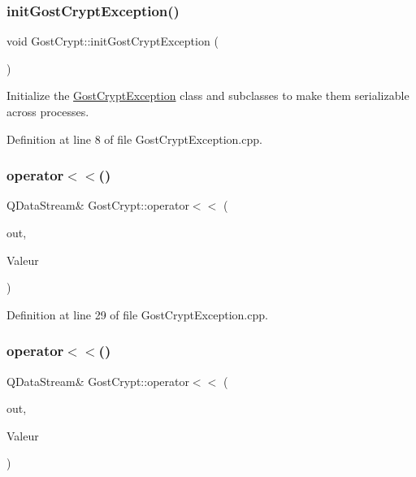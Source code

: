 \subsubsection{\texorpdfstring{init\+Gost\+Crypt\+Exception()}{initGostCryptException()}}
{\footnotesize\ttfamily void Gost\+Crypt\+::init\+Gost\+Crypt\+Exception (\begin{DoxyParamCaption}{ }\end{DoxyParamCaption})}



Initialize the \hyperlink{class_gost_crypt_1_1_gost_crypt_exception}{Gost\+Crypt\+Exception} class and subclasses to make them serializable across processes. 



Definition at line 8 of file Gost\+Crypt\+Exception.\+cpp.

\mbox{\label{namespace_gost_crypt_a047bc2c476276b6fda87390679fe51d8}} 
\subsubsection{\texorpdfstring{operator$<$$<$()}{operator<<()}\hspace{0.1cm}{\footnotesize\ttfamily [1/13]}}
{\footnotesize\ttfamily Q\+Data\+Stream\& Gost\+Crypt\+::operator$<$$<$ (\begin{DoxyParamCaption}\item[{Q\+Data\+Stream \&}]{out,  }\item[{const \hyperlink{class_gost_crypt_1_1_gost_crypt_exception}{Gost\+Crypt\+::\+Gost\+Crypt\+Exception} \&}]{Valeur }\end{DoxyParamCaption})}



Definition at line 29 of file Gost\+Crypt\+Exception.\+cpp.

\mbox{\label{namespace_gost_crypt_a9fc12a1e84452ffc1afabd85386fae1f}} 
\subsubsection{\texorpdfstring{operator$<$$<$()}{operator<<()}\hspace{0.1cm}{\footnotesize\ttfamily [2/13]}}
{\footnotesize\ttfamily Q\+Data\+Stream\& Gost\+Crypt\+::operator$<$$<$ (\begin{DoxyParamCaption}\item[{Q\+Data\+Stream \&}]{out,  }\item[{const \hyperlink{class_gost_crypt_1_1_system_exception}{Gost\+Crypt\+::\+System\+Exception} \&}]{Valeur }\end{DoxyParamCaption})}



